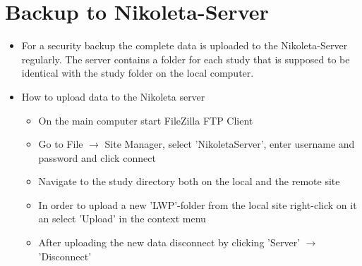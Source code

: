 \documentclass[11pt]{article}
\begin{document}
\section*{Backup to Nikoleta-Server}
\begin{itemize}
\item For a security backup the complete data is uploaded to the Nikoleta-Server regularly. The server contains a folder for each study that is supposed to be identical with the study folder on the local computer.
\item How to upload data to the Nikoleta server
\begin{itemize}
	\item On the main computer start FileZilla FTP Client
	\item Go to File $\rightarrow$ Site Manager, select 'NikoletaServer', enter username and password and click connect
	\item Navigate to the study directory both on the local and the remote site
	\item In order to upload a new 'LWP'-folder from the local site right-click on it an select 'Upload' in the context menu
	\item After uploading the new data disconnect by clicking 'Server' $\rightarrow$ 'Disconnect'
\end{itemize}
\end{itemize}
\end{document}
